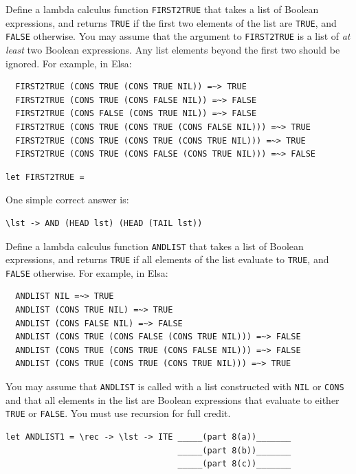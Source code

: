 \documentclass[addpoints,answers]{exam}
\begin{document}
\begin{questions}
\question[7]

Define a lambda calculus function \texttt{FIRST2TRUE} that takes a list of Boolean expressions, and returns \texttt{TRUE} if the first two elements of the list are \texttt{TRUE}, and \texttt{FALSE} otherwise.  You may assume that the argument to \texttt{FIRST2TRUE} is a list of \emph{at least} two Boolean expressions.  Any list elements beyond the first two should be ignored.  For example, in Elsa:

\begin{verbatim}
  FIRST2TRUE (CONS TRUE (CONS TRUE NIL)) =~> TRUE
  FIRST2TRUE (CONS TRUE (CONS FALSE NIL)) =~> FALSE
  FIRST2TRUE (CONS FALSE (CONS TRUE NIL)) =~> FALSE
  FIRST2TRUE (CONS TRUE (CONS TRUE (CONS FALSE NIL))) =~> TRUE
  FIRST2TRUE (CONS TRUE (CONS TRUE (CONS TRUE NIL))) =~> TRUE
  FIRST2TRUE (CONS TRUE (CONS FALSE (CONS TRUE NIL))) =~> FALSE
\end{verbatim}

\begin{verbatim}
let FIRST2TRUE = 
\end{verbatim}
\begin{solutionorbox}[2in]
One simple correct answer is:
\begin{verbatim}
\lst -> AND (HEAD lst) (HEAD (TAIL lst))
\end{verbatim}
\end{solutionorbox}

\newpage

\question Define a lambda calculus function \texttt{ANDLIST} that takes a list of Boolean expressions, and returns \texttt{TRUE} if all elements of the list evaluate to \texttt{TRUE}, and \texttt{FALSE} otherwise. For example, in Elsa:

\begin{verbatim}
  ANDLIST NIL =~> TRUE
  ANDLIST (CONS TRUE NIL) =~> TRUE
  ANDLIST (CONS FALSE NIL) =~> FALSE
  ANDLIST (CONS TRUE (CONS FALSE (CONS TRUE NIL))) =~> FALSE
  ANDLIST (CONS TRUE (CONS TRUE (CONS FALSE NIL))) =~> FALSE
  ANDLIST (CONS TRUE (CONS TRUE (CONS TRUE NIL))) =~> TRUE
\end{verbatim}

You may assume that \texttt{ANDLIST} is called with a list constructed with \texttt{NIL} or \texttt{CONS} and that all elements in the list are Boolean expressions that evaluate to either \texttt{TRUE} or \texttt{FALSE}.  You must use recursion for full credit.

\begin{verbatim}
let ANDLIST1 = \rec -> \lst -> ITE _____(part 8(a))_______
                                   _____(part 8(b))_______
                                   _____(part 8(c))_______
                      

\end{verbatim}
\end{questions}
\end{document}
